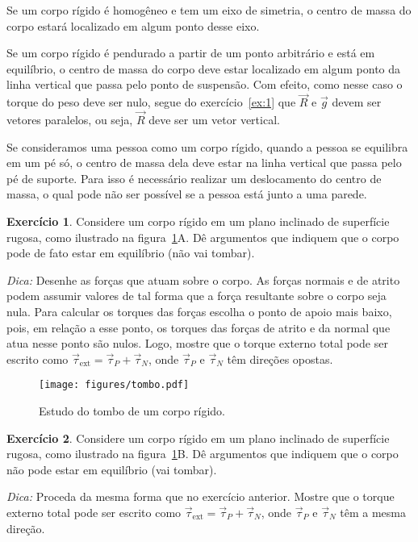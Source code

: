 \documentclass[12pt,a4paper]{article}
\theoremstyle{definition}
\newtheorem{ex}{Exercício}[section]
\begin{document}
Se um corpo rígido é homogêneo e tem um eixo de simetria, o centro de
massa do corpo estará localizado em algum ponto desse eixo.

Se um corpo rígido é pendurado a partir de um ponto arbitrário e está
em equilíbrio, o centro de massa do corpo deve estar localizado em
algum ponto da linha vertical que passa pelo ponto de suspensão. Com
efeito, como nesse caso o torque do peso deve ser nulo, segue do
exercício~\ref{ex:1} que $\vec R$ e $\vec g$ devem ser vetores
paralelos, ou seja, $\vec R$ deve ser um vetor vertical.

Se consideramos uma pessoa como um corpo rígido, quando a pessoa se
equilibra em um pé só, o centro de massa dela deve estar na linha
vertical que passa pelo pé de suporte. Para isso é necessário realizar
um deslocamento do centro de massa, o qual pode não ser possível se a
pessoa está junto a uma parede.

\begin{ex}
  Considere um corpo rígido em um plano inclinado de superfície
  rugosa, como ilustrado na figura~\ref{fig:tombo}A. Dê argumentos que
  indiquem que o corpo pode de fato estar em equilíbrio (não vai
  tombar).

  \noindent\textit{Dica:} Desenhe as forças que atuam sobre o
  corpo. As forças normais e de atrito podem assumir valores de tal
  forma que a força resultante sobre o corpo seja nula. Para calcular
  os torques das forças escolha o ponto de apoio mais baixo, pois, em
  relação a esse ponto, os torques das forças de atrito e da normal
  que atua nesse ponto são nulos. Logo, mostre que o torque externo
  total pode ser escrito como
  $\vec \tau_{\mathrm{ext}}=\vec\tau_P+\vec\tau_N$, onde $\vec\tau_P$
  e $\vec\tau_N$ têm direções opostas.
  \begin{figure}[t]
    \centering
    \texttt{[image: figures/tombo.pdf]}
    \caption{Estudo do tombo de um corpo rígido.}
    \label{fig:tombo}
  \end{figure}
\end{ex}

\begin{ex}
  Considere um corpo rígido em um plano inclinado de superfície
  rugosa, como ilustrado na figura~\ref{fig:tombo}B. Dê argumentos que
  indiquem que o corpo não pode estar em equilíbrio (vai tombar).

  \noindent\textit{Dica:} Proceda da mesma forma que no exercício
  anterior. Mostre que o torque externo total pode ser escrito como
  $\vec\tau_{\mathrm{ext}}=\vec\tau_P+\vec\tau_N$, onde $\vec\tau_P$ e
  $\vec\tau_N$ têm a mesma direção.
\end{ex}
\end{document}
